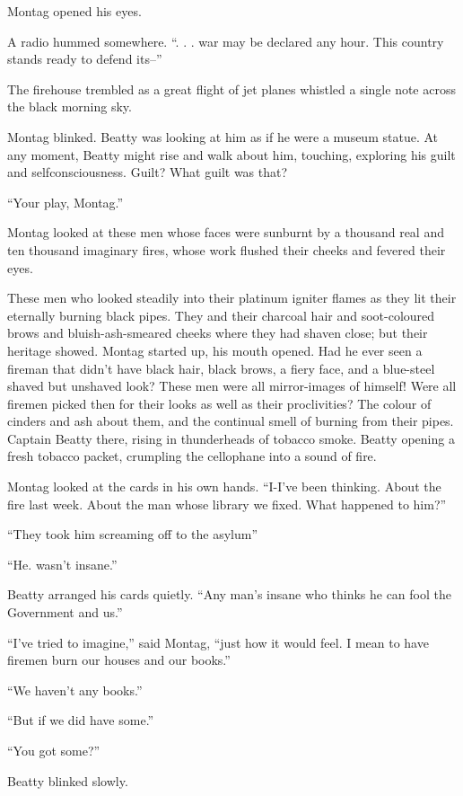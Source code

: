 \documentclass[11pt,openany]{book}
\begin{document}
Montag opened his eyes.

A radio hummed somewhere. ``. . . war may be declared any hour. This country stands ready to defend its--''

The firehouse trembled as a great flight of jet planes whistled a single note across the black morning sky.

Montag blinked. Beatty was looking at him as if he were a museum statue. At any moment, Beatty might rise and walk about him, touching, exploring his guilt and selfconsciousness. Guilt? What guilt was that?

``Your play, Montag.''

Montag looked at these men whose faces were sunburnt by a thousand real and ten thousand imaginary fires, whose work flushed their cheeks and fevered their eyes.

These men who looked steadily into their platinum igniter flames as they lit their eternally burning black pipes. They and their charcoal hair and soot-coloured brows and bluish-ash-smeared cheeks where they had shaven close; but their heritage showed. Montag started up, his mouth opened. Had he ever seen a fireman that didn't have black hair, black brows, a fiery face, and a blue-steel shaved but unshaved look? These men were all mirror-images of himself! Were all firemen picked then for their looks as well as their proclivities? The colour of cinders and ash about them, and the continual smell of burning from their pipes. Captain Beatty there, rising in thunderheads of tobacco smoke. Beatty opening a fresh tobacco packet, crumpling the cellophane into a sound of fire.

Montag looked at the cards in his own hands. ``I-I've been thinking. About the fire last week. About the man whose library we fixed. What happened to him?''

``They took him screaming off to the asylum''

``He. wasn't insane.''

Beatty arranged his cards quietly. ``Any man's insane who thinks he can fool the Government and us.''

``I've tried to imagine,'' said Montag, ``just how it would feel. I mean to have firemen burn our houses and our books.''

``We haven't any books.''

``But if we did have some.''

``You got some?''

Beatty blinked slowly.
\end{document}
